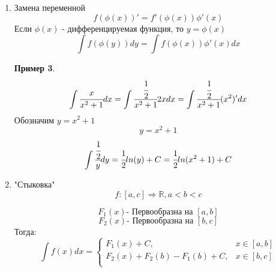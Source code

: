 \documentclass[a4paper]{article}
\theoremstyle{definition}
\newtheorem*{exmp}{Пример}
\newtheorem*{comment}{Замечание}
\numberwithin{theorem}{subsection}
\numberwithin{lemma}{subsection}
\numberwithin{definition}{subsection}
\numberwithin{comment*}{subsection}
\numberwithin{consequence}{subsection}
\numberwithin{property}{subsection}
\begin{document}
\begin{enumerate}
       $$(f(x)g(x))'= f'(x)g(x) + f(x)g'(x)$$
       $$ \int (f'(x)g(x) + f(x)g'(x)) dx = f(x)g(x) + C $$
       $$ \int f(x)g'(x)dx = f(x)g(x)- \int f'(x)g(x)dx + C$$

       \begin{exmp}
        $$ \int x sin(x) dx = \int x (-cosx)'dx = x(-cosx) - \int (-cosx)dx =$$
        $$= x(-cosx) + \int cos(x)dx=-xcosx + sinx + C$$
       \end{exmp}
       \begin{exmp}
        $$ \int lnx dx = \int x' ln(x) dx = x ln(x) - \int 1 dx = x ln(x) -x + C$$
       \end{exmp}
 \item Замена переменной
       $$f(\phi(x))'= f'(\phi(x))\phi'(x)$$
       Если $\phi(x)$ - дифференцируемая функция, то $y = \phi(x)$
       $$ \int f(\phi(y))dy = \int f(\phi(x))\phi'(x)dx$$
       \begin{exmp}
        $$ \int \cfrac{x}{x^2+1} dx = \int \cfrac{\cfrac{1}{2}}{x^2+1} 2x dx = \int \cfrac{\cfrac{1}{2}}{x^2+1} (x^2)' dx$$
        Обозначим $y = x^2 + 1$
        $$ y = x^2 + 1  $$
        $$ \int  \cfrac{\cfrac{1}{2}}{y}dy = \cfrac{1}{2}ln(y) + C = \cfrac{1}{2}ln(x^2 + 1) + C$$
       \end{exmp}
 \item "Стыковка"
       $$f:[a,c] \Rightarrow \mathbb{R}, a<b<c$$

       $$ F_1(x) \text{- Первообразна на }[a,b]$$
       $$ F_2(x) \text{- Первообразна на }[b,c]$$
       Тогда:
       $$ \int f(x) dx = \begin{cases}
         F_1(x) + C,               & x\in [a,b] \\
         F_2(x) + F_2(b)-F_1(b)+C, & x\in [b,c] \\
        \end{cases}$$
\end{enumerate}
\end{document}

